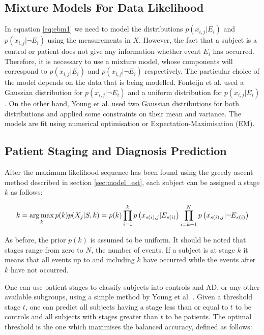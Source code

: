 \subsection{Mixture Models For Data Likelihood}
\label{sec:mix_models}

In equation \ref{eq:ebm1} we need to model the distributions $p\left(x_{i,j} | E_{i} \right)$ and $p\left(x_{i,j} | \neg E_{i}\right)$ using the measurements in $X$. However, the fact that a subject is a control or patient does not give any information whether event $E_{i}$ has occurred. Therefore, it is necessary to use a mixture model, whose components will correspond to $p\left(x_{i,j} | E_{i} \right)$ and $p\left(x_{i,j} | \neg E_{i}\right)$ respectively. The particular choice of the model depends on the data that is being modelled. Fonteijn et al. \cite{fonteijn2012event} used a Gaussian distribution for $p\left(x_{i,j} | \neg E_{i}\right)$ and a uniform distribution for $p\left(x_{i,j} | E_{i} \right)$. On the other hand, Young et al. \cite{young2014data} used two Gaussian distributions for both distributions and applied some constraints on their mean and variance. The models are fit using numerical optimisation or Expectation-Maximisation (EM).

\subsection{Patient Staging and Diagnosis Prediction}
\label{sec:staging}

After the maximum likelihood sequence has been found using the greedy ascent method described in section \ref{sec:model_est}, each subject can be assigned a stage $k$ as follows:

\begin{equation}
\label{eq:staging}
 k = \operatorname*{arg\,max}_k p(k) p(X_j | S, k) = p(k) \prod_{i=1}^k p\left(x_{s(i),j} | E_{s(i)} \right) \prod_{i=k+1}^N p\left(x_{s(i),j} | \neg E_{s(i)}\right) 
\end{equation}
 

As before, the prior $p(k)$ is assumed to be uniform. It should be noted that stages range from zero to $N$, the number of events. If a subject is at stage $k$ it means that all events up to and including $k$ have occurred while the events after $k$ have not occurred. 

One can use patient stages to classify subjects into controls and AD, or any other available subgroups, using a simple method by Young et al. \cite{young2014data}. Given a threshold stage $t$, one can predict all subjects having a stage less than or equal to $t$ to be controls and all subjects with stages greater than $t$ to be patients. The optimal threshold is the one which maximises the balanced accuracy, defined as follows:

